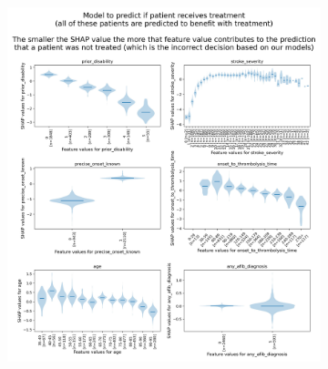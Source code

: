 \begin{figure}
    \centering
    \begin{subfigure}{.5\textwidth}
      \centering
      \captionsetup{width=.9\linewidth}
      \includegraphics[trim={0 0 0 5cm}, clip, width=0.95\linewidth]    {./images/210_xgb_all_data_multiclass_outcome_999999_shap_violin_all_features_all_benefit_with_ivt}\\
      \label{fig:mrs_violin}
    \end{subfigure}%
    \begin{subfigure}{.5\textwidth}
      \centering
      \captionsetup{width=.9\linewidth}

\end{subfigure}
\end{figure}
